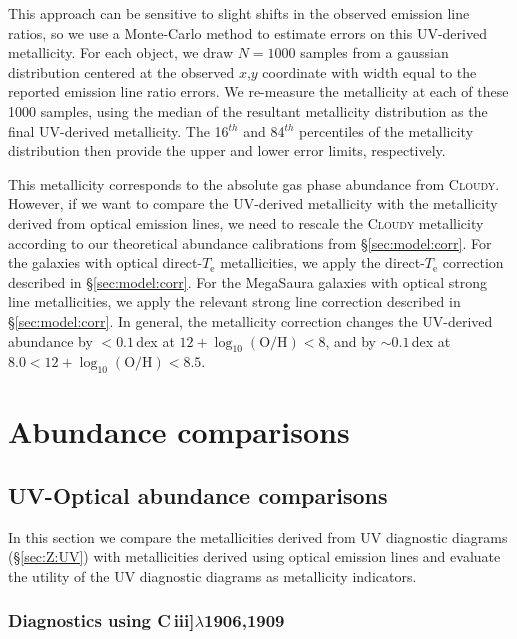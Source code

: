 \documentclass[preprint2]{aastex62}
\newcommand{\Cloudy}{\textsc{Cloudy}\xspace}
\newcommand{\ciii}{C\,{\sc iii}]\xspace}
\newcommand{\logten}{\ensuremath{\log_{10}}}
\newcommand{\logOH}{\ensuremath{\logten (\mathrm{O}/\mathrm{H})}\xspace}
\newcommand{\mage}{{\sc Meg}a{\sc S}a{\sc ura}\xspace}
\newcommand{\Te}{\ensuremath{T_{\mathrm{e}}}\xspace}
\begin{document}
This approach can be sensitive to slight shifts in the observed emission line ratios, so we use a Monte-Carlo method to estimate errors on this UV-derived metallicity. For each object, we draw $N=1000$ samples from a gaussian distribution centered at the observed $x$,$y$ coordinate  with width equal to the reported emission line ratio errors. We re-measure the metallicity at each of these 1000 samples, using the median of the resultant metallicity distribution as the final UV-derived metallicity. The 16$^{th}$ and 84$^{th}$ percentiles of the metallicity distribution then provide the upper and lower error limits, respectively.

This metallicity corresponds to the absolute gas phase abundance from \Cloudy. However, if we want to compare the UV-derived metallicity with the metallicity derived from optical emission lines, we need to rescale the \Cloudy metallicity according to our theoretical abundance calibrations from \S\ref{sec:model:corr}. For the \citet{Berg+2016} galaxies  with optical direct-\Te metallicities, we apply the direct-\Te correction described in \S\ref{sec:model:corr}. For the \mage galaxies with optical strong line metallicities, we apply the relevant strong line correction described in \S\ref{sec:model:corr}. In general, the metallicity correction changes the UV-derived abundance by $<0.1$\,dex at $12 + \logOH < 8$, and by ${\sim}0.1$\,dex at $8.0 < 12 + \logOH < 8.5$.


\section{Abundance comparisons}\label{sec:UVOpt}

\subsection{UV-Optical abundance comparisons}

In this section we compare the metallicities derived from UV diagnostic diagrams (\S\ref{sec:Z:UV}) with metallicities derived using optical emission lines and evaluate the utility of the UV diagnostic diagrams as metallicity indicators.

\subsubsection{Diagnostics using \ciii$\lambda$1906,1909}\label{sec:UVOpt:C}
\end{document}
